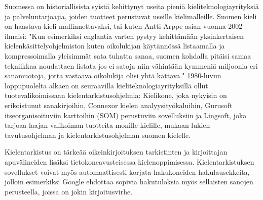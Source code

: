 \documentclass[]{../../metanetpaper}
\begin{document}
\begin{Parallel}[c]{70mm}{70mm}
{Suomessa on historiallisista syistä kehittynyt useita pieniä
kieliteknologiayrityksiä ja palveluntarjoajia, joiden tuotteet
perustuvat useille kielimalleille. Suomen kieli on haastava kieli
mallinnettavaksi, tai kuten Antti Arppe asian vuonna 2002 ilmaisi:
"Kun esimerkiksi englantia varten pystyy kehittämään yksinkertaisen
kielenkäsittelyohjelmiston kuten oikolukijan käytännössä listaamalla
ja kompressoimalla yleisimmät sata tuhatta sanaa, suomen kohdalla
pitäisi samaa tekniikkaa noudattaen listata jos ei satoja niin
vähintään kymmeniä miljoonia eri sanamuotoja, jotta vastaava
oikolukija olisi yhtä kattava." \cite{EiPolkua} 1980-luvun
loppupuolelta alkaen on seuraavilla kieliteknologiayrityksillä ollut
tuotevalikoimissaan kielentarkistusohjelmia: Kielikone, joka nykyisin
on erikoistunut sanakirjoihin, Connexor kielen analyysityökaluihin,
Gurusoft itseorganisoituviin karttoihin (SOM) perustuviin sovelluksiin
ja Lingsoft, joka tarjoaa laajan valikoiman tuotteita monille
kielille, mukaan lukien tavutusohjelman ja kielentarkistusohjelman
suomen kielelle.

Kielentarkistus on tärkeää oikeinkirjoituksen tarkistinten ja
kirjoittajan apuvälineiden lisäksi tietokoneavusteisessa
kielenoppimisessa.  Kielentarkistuksen sovellukset voivat myös
automaattisesti korjata hakukoneiden hakulausekkeita, jolloin
esimerkiksi Google ehdottaa sopivia hakutuloksia myös sellaisten
sanojen perusteella, joissa on jokin kirjoitusvirhe.
}

\end{Parallel}
\end{document}
